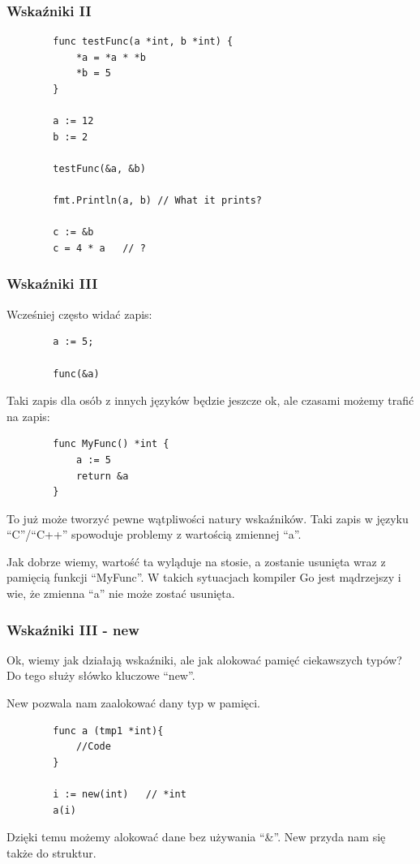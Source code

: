 \documentclass[10pt]{beamer}
\newcommand{\quotes}[1]{``#1''}
\begin{document}
\begin{frame}[fragile]
    \frametitle{Wskaźniki II}
    \begin{verbatim}
        func testFunc(a *int, b *int) {
            *a = *a * *b
            *b = 5
        }

        a := 12
        b := 2

        testFunc(&a, &b) 

        fmt.Println(a, b) // What it prints?

        c := &b
        c = 4 * a   // ?
    \end{verbatim}
\end{frame}

\begin{frame}[fragile]
    \frametitle{Wskaźniki III}
    Wcześniej często widać zapis:
    \begin{verbatim}
        a := 5;

        func(&a)
    \end{verbatim}

    Taki zapis dla osób z innych języków będzie jeszcze ok, ale czasami możemy
    trafić na zapis:

    \begin{verbatim}
        func MyFunc() *int {
            a := 5
            return &a
        }
    \end{verbatim}

    To już może tworzyć pewne wątpliwości natury wskaźników. Taki zapis w języku 
    \quotes{C}/\quotes{C++} spowoduje problemy z wartością zmiennej \quotes{a}.

    Jak dobrze wiemy, wartość ta wyląduje na stosie, a zostanie usunięta wraz z pamięcią
    funkcji \quotes{MyFunc}. W takich sytuacjach kompiler Go jest mądrzejszy i wie,
    że zmienna \quotes{a} nie może zostać usunięta.

\end{frame}

\begin{frame}[fragile]
    \frametitle{Wskaźniki III - new}
    Ok, wiemy jak działają wskaźniki, ale jak alokować pamięć ciekawszych typów?
    Do tego służy słówko kluczowe \quotes{new}.

    New pozwala nam zaalokować dany typ w pamięci.

    \begin{verbatim}
        func a (tmp1 *int){
            //Code
        }

        i := new(int)   // *int
        a(i)
    \end{verbatim}

    Dzięki temu możemy alokować dane bez używania \quotes{\&}. New przyda nam się
    także do struktur.
\end{frame}
\end{document}

